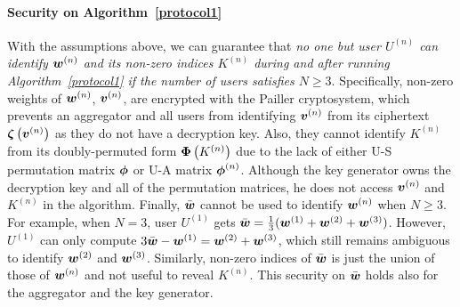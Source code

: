 \documentclass[10pt,twocolumn,letterpaper]{article}
\def\vct#1{\mbox{\boldmath $#1$}}
\def\ui#1{^{(#1)}}
\def\perm{\vct{\phi}}
\def\he#1{\vct{\zeta}\left(#1\right)}
\def\dperm#1{\vct{\Phi}\left(#1\right)}
\begin{document}
\paragraph{Security on Algorithm~\ref{protocol1}}
With the assumptions above, we can guarantee that \emph{no one but user $U\ui{n}$ can identify $\vct{w}\ui{n}$ and its non-zero indices $K\ui{n}$ during and after running Algorithm~\ref{protocol1} if the number of users satisfies $N\geq 3$}. Specifically, non-zero weights of $\vct{w}\ui{n}$, $\vct{v}\ui{n}$, are encrypted with the Pailler cryptosystem, which prevents an aggregator and all users from identifying $\vct{v}\ui{n}$ from its ciphertext $\he{\vct{v}\ui{n}}$ as they do not have a decryption key. Also, they cannot identify $K\ui{n}$ from its doubly-permuted form $\dperm{K\ui{n}}$ due to the lack of either U-S permutation matrix $\perm$ or U-A matrix $\perm\ui{n}$. Although the key generator owns the decryption key and all of the permutation matrices, he does not access $\vct{v}\ui{n}$ and $K\ui{n}$ in the algorithm. Finally, $\bar{\vct{w}}$ cannot be used to identify $\vct{w}\ui{n}$ when $N\geq 3$. For example, when $N=3$, user $U\ui{1}$ gets $\bar{\vct{w}}=\frac{1}{3}(\vct{w}\ui{1} + \vct{w}\ui{2} + \vct{w}\ui{3})$. However, $U\ui{1}$ can only compute $3\bar{\vct{w}} - \vct{w}\ui{1} = \vct{w}\ui{2} + \vct{w}\ui{3}$, which still remains ambiguous to identify $\vct{w}\ui{2}$ and $\vct{w}\ui{3}$. Similarly, non-zero indices of $\bar{\vct{w}}$ is just the union of those of $\vct{w}\ui{n}$ and not useful to reveal $K\ui{n}$. This security on $\bar{\vct{w}}$ holds also for the aggregator and the key generator.

\end{document}
